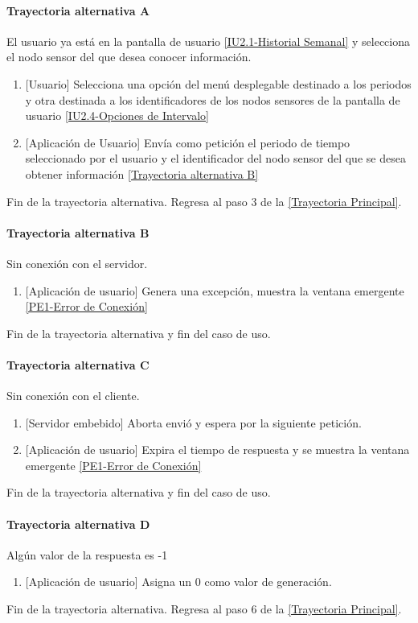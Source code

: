 \paragraph{Trayectoria alternativa A} \label{SUB-U-CU1.3:TA}
    El usuario ya está en la pantalla de usuario \hyperref[fig:Historial Semanal]{[IU2.1-Historial Semanal]} y selecciona el nodo sensor del que desea conocer información.
	\begin{enumerate}[label=A\arabic*.]
	    \item {[Usuario]} Selecciona una opción del menú desplegable destinado a los periodos y otra destinada a los identificadores de los nodos sensores de la pantalla de usuario \hyperref[fig:Opciones de Intervalo]{[IU2.4-Opciones de Intervalo]} 
	    \item {[Aplicación de Usuario]} Envía como petición el periodo de tiempo seleccionado por el usuario y el identificador del nodo sensor del que se desea obtener información \hyperref[SUB-U-CU1.3:TB]{[Trayectoria alternativa B]} 
	\end{enumerate}
	Fin de la trayectoria alternativa. Regresa al paso 3 de la \hyperref[SUB-U-CU1.3:TP]{[Trayectoria Principal]}.
	
\paragraph{Trayectoria alternativa B} \label{SUB-U-CU1.3:TB}
	Sin conexión con el servidor.
	\begin{enumerate}[label=B\arabic*.]
		\item {[Aplicación de usuario]} Genera una excepción, muestra la ventana emergente \hyperref[fig:Error de Conexion]{[PE1-Error de Conexión]}
	\end{enumerate}
	Fin de la trayectoria alternativa y fin del caso de uso.

\paragraph{Trayectoria alternativa C} \label{SUB-U-CU1.3:TC}
	Sin conexión con el cliente.
	\begin{enumerate}[label=C\arabic*.]
		\item {[Servidor embebido]} Aborta envió y espera por la siguiente petición.
		\item {[Aplicación de usuario]} Expira el tiempo de respuesta y se muestra la ventana emergente \hyperref[fig:Error de Conexion]{[PE1-Error de Conexión]}
	\end{enumerate}
	Fin de la trayectoria alternativa y fin del caso de uso.
	
\paragraph{Trayectoria alternativa D} \label{SUB-U-CU1.3:TD}
	Algún valor de la respuesta es -1
	\begin{enumerate}[label=D\arabic*.]
		\item {[Aplicación de usuario]} Asigna un 0 como valor de generación.
	\end{enumerate}
	Fin de la trayectoria alternativa. Regresa al paso 6 de la \hyperref[SUB-U-CU1.3:TP]{[Trayectoria Principal]}.